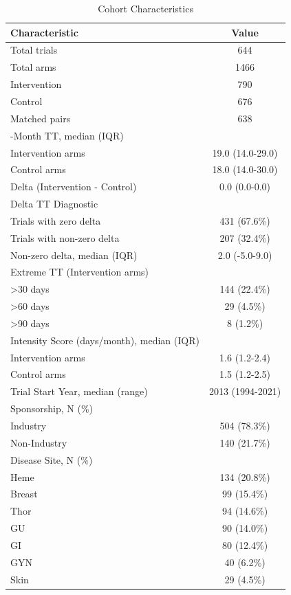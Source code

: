 \begin{table}[htbp]
\centering
\caption{Cohort Characteristics}
\begin{tabular}{lc}
\toprule
Characteristic & Value \\
\midrule
Total trials & 644 \\
Total arms & 1466 \\
  Intervention & 790 \\
  Control & 676 \\
Matched pairs & 638 \\
\addlinespace
12-Month TT, median (IQR) &  \\
  Intervention arms & 19.0 (14.0-29.0) \\
  Control arms & 18.0 (14.0-30.0) \\
  Delta (Intervention - Control) & 0.0 (0.0-0.0) \\
\addlinespace
Delta TT Diagnostic &  \\
  Trials with zero delta & 431 (67.6\%) \\
  Trials with non-zero delta & 207 (32.4\%) \\
  Non-zero delta, median (IQR) & 2.0 (-5.0-9.0) \\
\addlinespace
Extreme TT (Intervention arms) &  \\
  >30 days & 144 (22.4\%) \\
  >60 days & 29 (4.5\%) \\
  >90 days & 8 (1.2\%) \\
\addlinespace
Intensity Score (days/month), median (IQR) &  \\
  Intervention arms & 1.6 (1.2-2.4) \\
  Control arms & 1.5 (1.2-2.5) \\
\addlinespace
Trial Start Year, median (range) & 2013 (1994-2021) \\
\addlinespace
Sponsorship, N (\%) &  \\
  Industry & 504 (78.3\%) \\
  Non-Industry & 140 (21.7\%) \\
\addlinespace
Disease Site, N (\%) &  \\
  Heme & 134 (20.8\%) \\
  Breast & 99 (15.4\%) \\
  Thor & 94 (14.6\%) \\
  GU & 90 (14.0\%) \\
  GI & 80 (12.4\%) \\
  GYN & 40 (6.2\%) \\
  Skin & 29 (4.5\%) \\

\end{tabular}
\end{table}
